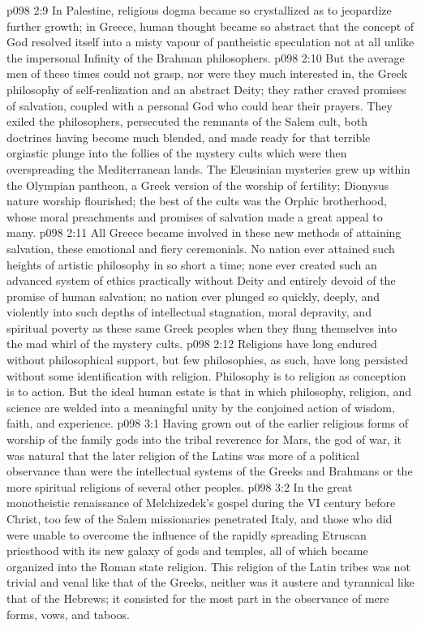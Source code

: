 \vs p098 2:9 In Palestine, religious dogma became so crystallized as to jeopardize further growth; in Greece, human thought became so abstract that the concept of God resolved itself into a misty vapour of pantheistic speculation not at all unlike the impersonal Infinity of the Brahman philosophers.
\vs p098 2:10 \pc But the average men of these times could not grasp, nor were they much interested in, the Greek philosophy of self\hyp{}realization and an abstract Deity; they rather craved promises of salvation, coupled with a personal God who could hear their prayers. They exiled the philosophers, persecuted the remnants of the Salem cult, both doctrines having become much blended, and made ready for that terrible orgiastic plunge into the follies of the mystery cults which were then overspreading the Mediterranean lands. The Eleusinian mysteries grew up within the Olympian pantheon, a Greek version of the worship of fertility; Dionysus nature worship flourished; the best of the cults was the Orphic brotherhood, whose moral preachments and promises of salvation made a great appeal to many.
\vs p098 2:11 All Greece became involved in these new methods of attaining salvation, these emotional and fiery ceremonials. No nation ever attained such heights of artistic philosophy in so short a time; none ever created such an advanced system of ethics practically without Deity and entirely devoid of the promise of human salvation; no nation ever plunged so quickly, deeply, and violently into such depths of intellectual stagnation, moral depravity, and spiritual poverty as these same Greek peoples when they flung themselves into the mad whirl of the mystery cults.
\vs p098 2:12 \pc Religions have long endured without philosophical support, but few philosophies, as such, have long persisted without some identification with religion. Philosophy is to religion as conception is to action. But the ideal human estate is that in which philosophy, religion, and science are welded into a meaningful unity by the conjoined action of wisdom, faith, and experience.
\vs p098 3:1 Having grown out of the earlier religious forms of worship of the family gods into the tribal reverence for Mars, the god of war, it was natural that the later religion of the Latins was more of a political observance than were the intellectual systems of the Greeks and Brahmans or the more spiritual religions of several other peoples.
\vs p098 3:2 In the great monotheistic renaissance of Melchizedek’s gospel during the VI century before Christ, too few of the Salem missionaries penetrated Italy, and those who did were unable to overcome the influence of the rapidly spreading Etruscan priesthood with its new galaxy of gods and temples, all of which became organized into the Roman state religion. This religion of the Latin tribes was not trivial and venal like that of the Greeks, neither was it austere and tyrannical like that of the Hebrews; it consisted for the most part in the observance of mere forms, vows, and taboos.
